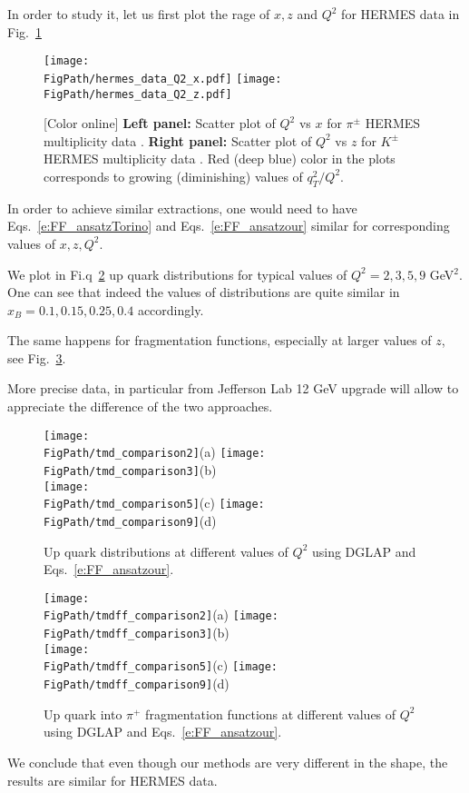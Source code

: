 \documentclass[final,3p,times,onecolumn,sort&compress,hidelinks]{elsarticle}
\newcommand\3[1]{\boldsymbol{#1}}
\newcommand*{\FigPath}{../Figs/}%
\begin{document}
In order to study it, let us first plot the rage of $x,z$ and $Q^2$ for HERMES data in Fig.~\ref{Fig:hermes_data_Q2}
\begin{figure}[htb!]
\centering
\texttt{[image: \\FigPath/hermes\_data\_Q2\_x.pdf]}
\texttt{[image: \\FigPath/hermes\_data\_Q2\_z.pdf]}
\caption{\label{Fig:hermes_data_Q2}
[Color online] {\bf Left panel:} Scatter plot of $Q^2$ vs $x$ for $\pi^\pm$ HERMES multiplicity data . {\bf Right panel:} 
Scatter plot of $Q^2$ vs $z$ for $K^\pm$ HERMES multiplicity data .  Red (deep blue) color in the plots corresponds to growing (diminishing) values of $q_T^2/Q^2$.
}
\end{figure}

In order to achieve similar extractions, one would need to have Eqs.~\eqref{e:FF_ansatzTorino} and Eqs.~\eqref{e:FF_ansatzour} similar for corresponding values of $x,z,Q^2$.

We plot in Fi.q~\ref{Fig:comparison} up quark distributions for typical values of $Q^2=2,3,5,9$ GeV$^2$.
One can see that indeed the values of distributions are quite similar in $x_B = 0.1, 0.15, 0.25, 0.4$ accordingly.

The same happens for fragmentation functions, especially at larger values of $z$, see Fig.~\ref{Fig:comparison_ff}.

More precise data, in particular from Jefferson Lab 12 GeV upgrade will allow to appreciate the difference of the two approaches.
\begin{figure}[htb!]
\centering
\texttt{[image: \\FigPath/tmd\_comparison2]}{\tiny(a)}%
\texttt{[image: \\FigPath/tmd\_comparison3]}{\tiny(b)}\\%
\texttt{[image: \\FigPath/tmd\_comparison5]}{\tiny(c)}%
\texttt{[image: \\FigPath/tmd\_comparison9]}{\tiny(d)}%
\caption{\label{Fig:comparison}
Up quark distributions  at different values of $Q^2$ using DGLAP and Eqs.~\ref{e:FF_ansatzour}.
}
\end{figure}

\begin{figure}[htb!]
\centering
\texttt{[image: \\FigPath/tmdff\_comparison2]}{\tiny(a)}%
\texttt{[image: \\FigPath/tmdff\_comparison3]}{\tiny(b)}\\%
\texttt{[image: \\FigPath/tmdff\_comparison5]}{\tiny(c)}%
\texttt{[image: \\FigPath/tmdff\_comparison9]}{\tiny(d)}%
\caption{\label{Fig:comparison_ff}
Up quark into $\pi^+$ fragmentation functions at different values of $Q^2$ using DGLAP and Eqs.~\ref{e:FF_ansatzour}.
}
\end{figure}

We conclude that even though our methods are very different in the shape, the results are similar for HERMES data.





\end{document}
